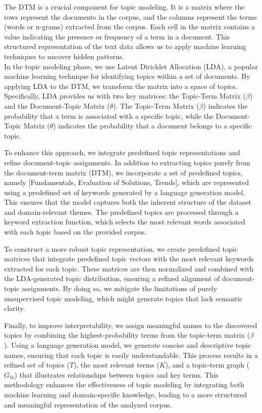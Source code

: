 \documentclass[runningheads]{llncs}
\begin{document}
The DTM is a crucial component for topic modeling. It is a matrix where the rows represent the documents in the corpus, and the columns represent the terms (words or n-grams) extracted from the corpus. Each cell in the matrix contains a value indicating the presence or frequency of a term in a document. This structured representation of the text data allows us to apply machine learning techniques to uncover hidden patterns.\\

In the topic modeling phase, we use Latent Dirichlet Allocation (LDA), a popular machine learning technique for identifying topics within a set of documents. By applying LDA to the DTM, we transform the matrix into a space of topics. Specifically, LDA provides us with two key matrices: the Topic-Term Matrix ($\beta$) and the Document-Topic Matrix ($\theta$). The Topic-Term Matrix ($\beta$) indicates the probability that a term is associated with a specific topic, while the Document-Topic Matrix ($\theta$) indicates the probability that a document belongs to a specific topic.

To enhance this approach, we integrate predefined topic representations and refine document-topic assignments. In addition to extracting topics purely from the document-term matrix (DTM), we incorporate a set of predefined topics, namely [Fundamentals, Evaluation of Solutions, Trends], which are represented using a predefined set of keywords generated by a language generation model. This ensures that the model captures both the inherent structure of the dataset and domain-relevant themes. The predefined topics are processed through a keyword extraction function, which selects the most relevant words associated with each topic based on the provided corpus.

To construct a more robust topic representation, we create predefined topic matrices that integrate predefined topic vectors with the most relevant keywords extracted for each topic. These matrices are then normalized and combined with the LDA-generated topic distribution, ensuring a refined alignment of document-topic assignments. By doing so, we mitigate the limitations of purely unsupervised topic modeling, which might generate topics that lack semantic clarity.

Finally, to improve interpretability, we assign meaningful names to the discovered topics by combining the highest-probability terms from the topic-term matrix ($\beta$). Using a language generation model, we generate concise and descriptive topic names, ensuring that each topic is easily understandable. This process results in a refined set of topics ($T$), the most relevant terms ($K$), and a topic-term graph ($G_{tk}$) that illustrates relationships between topics and key terms. This methodology enhances the effectiveness of topic modeling by integrating both machine learning and domain-specific knowledge, leading to a more structured and meaningful representation of the analyzed corpus.
\end{document}
